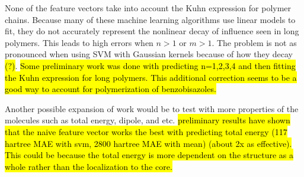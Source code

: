 \documentclass[10pt]{article}
\begin{document}
None of the feature vectors take into account the Kuhn expression for polymer chains. Because many of these machine learning algorithms use linear models to fit, they do not accurately represent the nonlinear decay of influence seen in long polymers. This leads to high errors when $n>1$ or $m>1$. The problem is not as pronounced when using SVM with Gaussian kernels because of how they decay \hl{(?)}. \hl{Some preliminary work was done with predicting n=1,2,3,4 and then fitting the Kuhn expression for long polymers. This additional correction seems to be a good way to account for polymerization of benzobisazoles.}




Another possible expansion of work would be to test with more properties of the molecules such as total energy, dipole, and etc. \hl{preliminary results have shown that the naive feature vector works the best with predicting total energy (117 hartree MAE with svm, 2800 hartree MAE with mean) (about 2x as effective). This could be because the total energy is more dependent on the structure as a whole rather than the localization to the core.}
\end{document}
